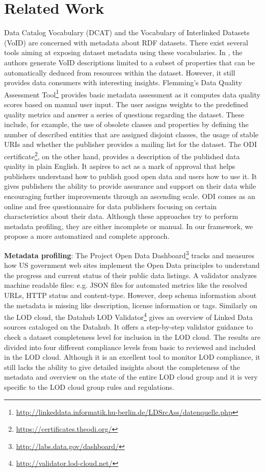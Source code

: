 \documentclass[runningheads,a4paper]{llncs}
\begin{document}
\section{Related Work}
\label{sec:related-work}
Data Catalog Vocabulary (DCAT) \cite{Erickson:14:DCV} and the Vocabulary of Interlinked Datasets (VoID) \cite{Cyganiak:11:DLD} are concerned with metadata about RDF datasets. There exist several tools aiming at exposing dataset metadata using these vocabularies. In \cite{BoHm:2011:CVD:2030805.2031001}, the authors generate VoID descriptions limited to a subset of properties that can be automatically deduced from resources within the dataset. However, it still provides data consumers with interesting insights. Flemming's Data Quality Assessment Tool\footnote{\url{http://linkeddata.informatik.hu-berlin.de/LDSrcAss/datenquelle.php}} provides basic metadata assessment as it computes data quality scores based on manual user input. The user assigns weights to the predefined quality metrics and answer a series of questions regarding the dataset. These include, for example, the use of obsolete classes and properties by defining the number of described entities that are assigned disjoint classes, the usage of stable URIs and whether the publisher provides a mailing list for the dataset. The ODI certificate\footnote{\url{https://certificates.theodi.org/}}, on the other hand, provides a description of the published data quality in plain English. It aspires to act as a mark of approval that helps publishers understand how to publish good open data and users how to use it. It gives publishers the ability to provide assurance and support on their data while encouraging further improvements through an ascending scale. ODI comes as an online and free questionnaire for data publishers focusing on certain characteristics about their data. Although these approaches try to perform metadata profiling, they are either incomplete or manual. In our framework, we propose a more automatized and complete approach.

\textbf{Metadata profiling}: The Project Open Data Dashboard\footnote{\url{http://labs.data.gov/dashboard/}} tracks and measures how US government web sites implement the Open Data principles to understand the progress and current status of their public data listings. A validator analyzes machine readable files: e.g. JSON files for automated metrics like the resolved URLs, HTTP status and content-type. However, deep schema information about the metadata is missing like description, license information or tags. Similarly on the LOD cloud, the Datahub LOD Validator\footnote{\url{http://validator.lod-cloud.net/}} gives an overview of Linked Data sources cataloged on the Datahub. It offers a step-by-step validator guidance to check a dataset completeness level for inclusion in the LOD cloud. The results are divided into four different compliance levels from basic to reviewed and included in the LOD cloud. Although it is an excellent tool to monitor LOD compliance, it still lacks the ability to give detailed insights about the completeness of the metadata and overview on the state of the entire LOD cloud group and it is very specific to the LOD cloud group rules and regulations.
\end{document}
